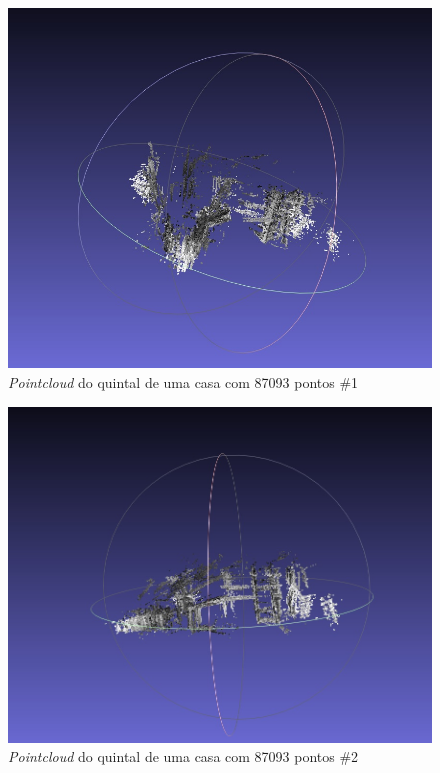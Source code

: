 \begin{figure}[H]
	\centering
		\includegraphics[width= \textwidth]{Imagens/figura4-10.jpg}
	\caption{\textit{Pointcloud} do quintal de uma casa com 87093 pontos \#1}
	\label{fig4:10}
\end{figure}

\begin{figure}[H]
	\centering
		\includegraphics[width= \textwidth]{Imagens/figura4-11.jpg}
	\caption{\textit{Pointcloud} do quintal de uma casa com 87093 pontos \#2}
	\label{fig4:11}
\end{figure}

